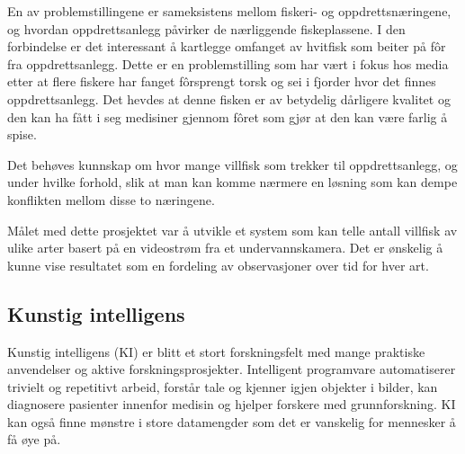 En av problemstillingene er sameksistens mellom fiskeri- og oppdrettsnæringene, og hvordan oppdrettsanlegg påvirker de nærliggende fiskeplassene. I den forbindelse er det interessant å kartlegge omfanget av hvitfisk som beiter på fôr fra oppdrettsanlegg. Dette er en problemstilling som har vært i fokus hos media etter at flere fiskere har fanget fôrsprengt torsk og sei i fjorder hvor det finnes oppdrettsanlegg. Det hevdes at denne fisken er av betydelig dårligere kvalitet og den kan ha fått i seg medisiner gjennom fôret som gjør at den kan være farlig å spise. \cite{Olsen 2019}

Det behøves kunnskap om hvor mange villfisk som trekker til oppdrettsanlegg, og under hvilke forhold, slik at man kan komme nærmere en løsning som kan dempe konflikten mellom disse to næringene. 

Målet med dette prosjektet var å utvikle et system som kan telle antall villfisk av ulike arter basert på en videostrøm fra et undervannskamera. Det er ønskelig å kunne vise resultatet som en fordeling av observasjoner over tid for hver art.

\subsection{Kunstig intelligens}
\label{part:ai}

Kunstig intelligens (KI) er blitt et stort forskningsfelt med mange praktiske anvendelser og aktive forskningsprosjekter. Intelligent programvare automatiserer trivielt og repetitivt arbeid, forstår tale og kjenner igjen objekter i bilder, kan diagnosere pasienter innenfor medisin og hjelper forskere med grunnforskning. KI kan også finne mønstre i store datamengder som det er vanskelig for mennesker å få øye på. \cite{Goodfellow m.fl. 2016 s. 1}

